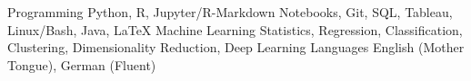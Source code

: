 

  \begin{cvskills}
    \cvskill
      {Programming} %
      {Python, R, Jupyter/R-Markdown Notebooks, Git, SQL, Tableau, Linux/Bash, Java, LaTeX} %
    \cvskill
      {Machine Learning} %
      {Statistics, Regression, Classification, Clustering, Dimensionality Reduction, Deep Learning} %
    \cvskill
      {Languages} %
      {English (Mother Tongue), German (Fluent)} %
 \end{cvskills}
